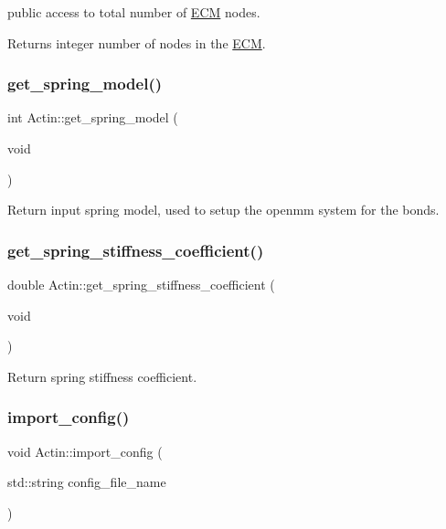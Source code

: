 public access to total number of \mbox{\hyperlink{classECM}{E\+CM}} nodes. 

\begin{DoxyReturn}{Returns}
integer number of nodes in the \mbox{\hyperlink{classECM}{E\+CM}}. 
\end{DoxyReturn}
\mbox{\label{classActin_adb7a38c592a496135519c58664752ec9}} 
\subsubsection{\texorpdfstring{get\_spring\_model()}{get\_spring\_model()}}
{\footnotesize\ttfamily int Actin\+::get\+\_\+spring\+\_\+model (\begin{DoxyParamCaption}\item[{void}]{ }\end{DoxyParamCaption})\hspace{0.3cm}{\ttfamily [inline]}}

Return input spring model, used to setup the openmm system for the bonds. \mbox{\label{classActin_abdb4d9b0af05a00dd532e546a69c1371}} 
\subsubsection{\texorpdfstring{get\_spring\_stiffness\_coefficient()}{get\_spring\_stiffness\_coefficient()}}
{\footnotesize\ttfamily double Actin\+::get\+\_\+spring\+\_\+stiffness\+\_\+coefficient (\begin{DoxyParamCaption}\item[{void}]{ }\end{DoxyParamCaption})\hspace{0.3cm}{\ttfamily [inline]}}

Return spring stiffness coefficient. \mbox{\label{classActin_a1758fb970eebc12ad08a2fa86a678236}} 
\subsubsection{\texorpdfstring{import\_config()}{import\_config()}}
{\footnotesize\ttfamily void Actin\+::import\+\_\+config (\begin{DoxyParamCaption}\item[{std\+::string}]{config\+\_\+file\+\_\+name }\end{DoxyParamCaption})}

